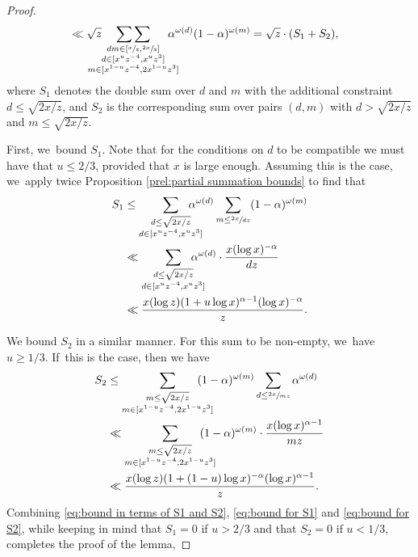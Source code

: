 \documentclass[10pt]{amsart}
\theoremstyle{plain}
\theoremstyle{definition}
\begin{document}
\begin{proof}
\begin{equation}
\begin{aligned}
&\ll \sqrt{z}\hspace*{-5mm} \mathop{\sum\sum}_{\substack{dm \in[\sfrac{x}{z},\sfrac{2x}{z}] \\ d\in[x^uz^{-4}, x^uz^3] \\ m\in[x^{1-u}z^{-4},2x^{1-u}z^3] }}\hspace*{-4mm} \alpha^{\omega(d)} (1-\alpha)^{\omega(m)}
= \sqrt{z}\cdot (S_1+S_2),
\end{aligned}
\end{equation}
where $S_1$ denotes the double sum over $d$ and $m$ with the additional constraint \hbox{$d\le \sqrt{2x/z}$}, and $S_2$ is the corresponding sum over pairs $(d,m)$ with $d>\sqrt{2x/z}$ and $m\le \sqrt{2x/z}$.

First, we~bound $S_1$. Note that for the conditions on $d$ to be compatible we must have that $u\le 2/3$, provided that $x$ is large enough. Assuming this is the case, we~apply twice Proposition \ref{prel:partial summation bounds} to find that
\begin{equation}\label{eq:bound for S1}
\begin{aligned}
S_1 &\le \sum_{\substack{d\le \sqrt{2x/z} \\ d\in[x^uz^{-4}, x^uz^3] }}\hspace*{-5mm} \alpha^{\omega(d)} \sum_{m\le \sfrac{2x}{dz}} (1-\alpha)^{\omega(m)} \\
&\ll \sum_{\substack{d\le \sqrt{2x/z} \\ d\in[x^uz^{-4}, x^uz^3] }}\hspace*{-5mm} \alpha^{\omega(d)} \cdot \frac{x(\log x)^{-\alpha}}{dz} \\
&\ll \frac{x(\log z)(1+ u\log x)^{\alpha-1}(\log x)^{-\alpha}}{z}.
\end{aligned}
\end{equation}

We bound $S_2$ in a similar manner. For this sum to be non-empty, we~have $u\ge1/3$. If~this is the case, then we have
\begin{equation}
\label{eq:bound for S2}
\begin{aligned}
S_2
&\le \sum_{\substack{m\le \sqrt{2x/z} \\ m\in[x^{1-u}z^{-4}, 2x^{1-u}z^3] }}\hspace*{-5mm} (1-\alpha)^{\omega(m)} \sum_{d\le \sfrac{2x}{mz}} \alpha^{\omega(d)} \\
&\ll \sum_{\substack{m\le \sqrt{2x/z} \\ m\in[x^{1-u}z^{-4}, 2x^{1-u}z^3] }}\hspace*{-5mm} (1-\alpha)^{\omega(m)} \cdot \frac{x(\log x)^{\alpha-1}}{mz} \\
&\ll \frac{x(\log z)(1+ (1-u)\log x)^{-\alpha}(\log x)^{\alpha-1}}{z}.
\end{aligned}
\end{equation}
Combining \eqref{eq:bound in terms of S1 and S2}, \eqref{eq:bound for S1} and \eqref{eq:bound for S2}, while keeping in mind that $S_1=0$ if $u>2/3$ and that $S_2=0$ if $u<1/3$, completes the proof of the lemma,
\end{proof}
\end{document}
